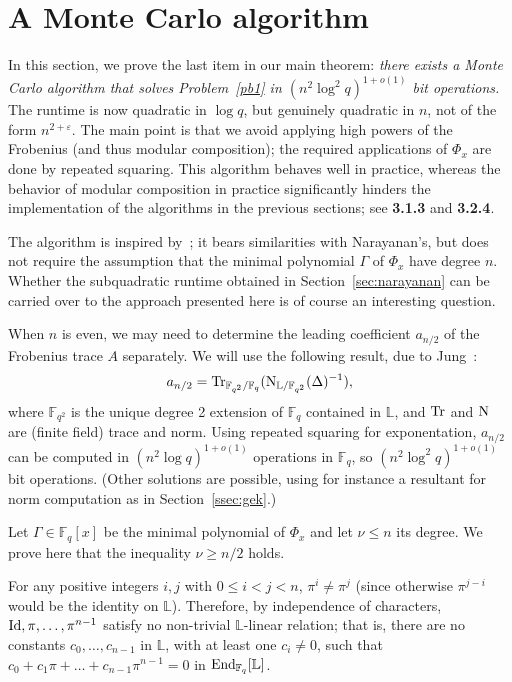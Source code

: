 \documentclass[sigconf]{acmart}
\newcommand{\F}{\mathbb{F}}
\renewcommand{\L}{\mathbb{L}}
\begin{document}

\section{A Monte Carlo algorithm}\label{sec:mc}

In this section, we prove the last item in our main theorem: {\em
  there exists a Monte Carlo algorithm that solves Problem~\ref{pb1}
  in $(n^2 \log^2 q)^{1+o(1)}$ bit operations.} The runtime is now
quadratic in $\log q$, but genuinely quadratic in $n$, not of the form
$n^{2+\varepsilon}$. The main point is that we avoid applying high
powers of the Frobenius (and thus modular composition); the required
applications of $\Phi_x$ are done by repeated squaring.  This
algorithm behaves well in practice, whereas the behavior of modular
composition in practice significantly hinders the implementation of
the algorithms in the previous sections; see {\bf 3.1.3} and {\bf
  3.2.4}.

The algorithm is inspired by~\cite[Th.~5]{Shoup94}; it bears
similarities with Narayanan's, but does not require the assumption
that the minimal polynomial $\Gamma$ of $\Phi_x$ have degree
$n$. Whether the subquadratic runtime obtained in
Section~\ref{sec:narayanan} can be carried over to the approach
presented here is of course an interesting question.

\smallskip{} When $n$ is even, we may need to
determine the leading coefficient $a_{n/2}$ of the Frobenius trace $A$
separately. We will use the following result, due to
Jung~\cite{Jung00,frobdist}:
\[a_{n/2} = {\rm Tr}_{\F_{q^2}/\F_{q}}({\rm N}_{\L/\F_{q^2}}(\Delta)^{-1}),\]
where $\F_{q^2}$ is the unique degree 2 extension of $\F_q$ contained
in $\L$, and ${\rm Tr}$ and ${\rm N}$ are (finite field) trace and
norm. Using repeated squaring for exponentation, $a_{n/2}$ can be
computed in $(n^2 \log q)^{1+o(1)}$ operations in $\F_q$, so $(n^2
  \log^2 q)^{1+o(1)}$ bit operations.
(Other solutions are possible, using for instance a resultant
 for norm computation as in Section~\ref{ssec:gek}.)

\smallskip{} Let $\Gamma \in \F_q[x]$ be the minimal
polynomial of $\Phi_x$ and let $\nu \le n$ its degree. We prove here 
that the inequality $\nu\ge n/2$ holds.

For any positive integers $i,j$ with $0 \le i < j < n$, $\pi^i \ne
\pi^j$ (since otherwise $\pi^{j-i}$ would be the identity on
$\L$). Therefore, by independence of characters, ${\rm Id}, \pi,
\ldots, \pi^{n-1}$ satisfy no non-trivial $\L$-linear relation;
that is, there are no constants $c_0, \ldots, c_{n-1}$ in $\L$,
with at least one $c_i \neq 0$, such that $c_0 + c_1 \pi + \ldots +
c_{n-1}\pi^{n-1}=0$ in ${\rm End}_{\F_q}[\L]$.
\end{document}
